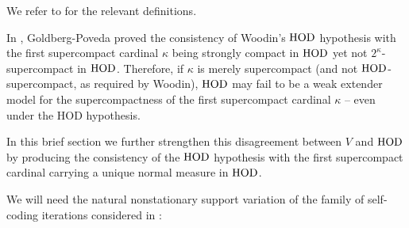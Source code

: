 \documentclass[11pt]{amsart}
\theoremstyle{definition}
\theoremstyle{remark}
\newcommand\HOD{\textnormal{HOD}}
\newcommand\<{{<}}
\begin{document}
We refer to \cite{midrasha} for the relevant definitions. 

In \cite{GoldbergPoveda}, Goldberg-Poveda proved the consistency of Woodin's $\HOD$ hypothesis with the first supercompact cardinal $\kappa$ being strongly compact in $\HOD$ yet not $2^\kappa$-supercompact in $\HOD$. Therefore, if $\kappa$ is merely supercompact (and not $\HOD$-supercompact, as required by Woodin),  $\HOD$ may fail to be a weak extender model for the supercompactness of the first supercompact cardinal $\kappa$ -- even under the HOD hypothesis.

In this brief section we further strengthen this disagreement between $V$ and $\HOD$ by producing the consistency of the $\HOD$ hypothesis with the first supercompact cardinal  carrying a unique normal measure in $\HOD$.

\smallskip

We will need the natural  nonstationary support variation of the family of self-coding iterations considered in \cite{GoldbergPoveda}:
\end{document}
